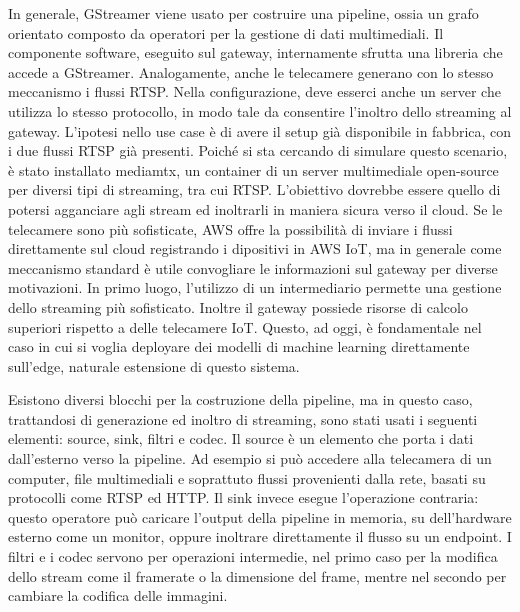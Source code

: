In generale, GStreamer viene usato per costruire una pipeline, ossia un grafo orientato composto da operatori per la gestione di dati multimediali. Il componente software, eseguito sul gateway, internamente sfrutta una libreria che accede a GStreamer. %
Analogamente, anche le telecamere generano con lo stesso meccanismo i flussi RTSP. Nella configurazione, deve esserci anche un server che utilizza lo stesso protocollo, in modo tale da consentire l'inoltro dello streaming al gateway. L'ipotesi nello use case è di avere il setup già disponibile in fabbrica, con i due flussi RTSP già presenti. Poiché si sta cercando di simulare questo scenario, è stato installato mediamtx, un container di un server multimediale open-source per diversi tipi di streaming, tra cui RTSP. L'obiettivo dovrebbe essere quello di potersi agganciare agli stream ed inoltrarli in maniera sicura verso il cloud. Se le telecamere sono più sofisticate, AWS offre la possibilità di inviare i flussi direttamente sul cloud registrando i dipositivi in AWS IoT, ma in generale come meccanismo standard è utile convogliare le informazioni sul gateway per diverse motivazioni. In primo luogo, l'utilizzo di un intermediario permette una gestione dello streaming più sofisticato. Inoltre il gateway possiede risorse di calcolo superiori rispetto a delle telecamere IoT. Questo, ad oggi, è fondamentale nel caso in cui si voglia deployare dei modelli di machine learning direttamente sull'edge, naturale estensione di questo sistema.

Esistono diversi blocchi per la costruzione della pipeline, ma in questo caso, trattandosi di generazione ed inoltro di streaming, sono stati usati i seguenti elementi: source, sink, filtri e codec. Il source è un elemento che porta i dati dall'esterno verso la pipeline. Ad esempio si può accedere alla telecamera di un computer, file multimediali e soprattuto flussi provenienti dalla rete, basati su protocolli come RTSP ed HTTP. Il sink invece esegue l'operazione contraria: questo operatore può caricare l'output della pipeline in memoria, su dell'hardware esterno come un monitor, oppure inoltrare direttamente il flusso su un endpoint. I filtri e i codec servono per operazioni intermedie, nel primo caso per la modifica dello stream come il framerate o la dimensione del frame, mentre nel secondo per cambiare la codifica delle immagini. 


